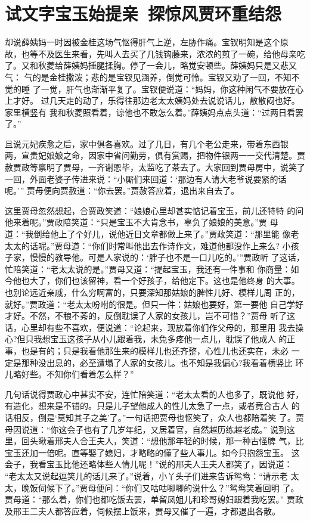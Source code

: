 \chapter{试文字宝玉始提亲~探惊风贾环重结怨}

却说薛姨妈一时因被金桂这场气怄得肝气上逆，左胁作痛。宝钗明知是这个原
故，也等不及医生来看，先叫人去买了几钱钩藤来，浓浓的煎了一碗，给他母亲吃
了。又和秋菱给薛姨妈捶腿揉胸。停了一会儿，略觉安顿些。薛姨妈只是又悲又气：
气的是金桂撒泼；悲的是宝钗见涵养，倒觉可怜。宝钗又劝了一回，不知不觉的睡
了一觉，肝气也渐渐平复了。宝钗便说道：“妈妈，你这种闲气不要放在心上才好。
过几天走的动了，乐得往那边老太太姨妈处去说说话儿，散散闷也好。家里横竖有
我和秋菱照看着，谅他也不敢怎么着。”薛姨妈点点头道：“过两日看罢了。”

且说元妃疾愈之后，家中俱各喜欢。过了几日，有几个老公走来，带着东西银
两，宣贵妃娘娘之命，因家中省问勤劳，俱有赏赐，把物件银两一一交代清楚。贾
赦贾政等禀明了贾母，一齐谢恩毕，太监吃了茶去了。大家回到贾母房中，说笑了
一回，外面老婆子传进来说：“小厮们来回道：‘那边有人请大老爷说要紧的话呢。’”
贾母便向贾赦道：“你去罢。”贾赦答应着，退出来自去了。

这里贾母忽然想起，合贾政笑道：“娘娘心里却甚实惦记着宝玉，前儿还特特
的问他来着呢。”贾政陪笑道：“只是宝玉不大肯念书，辜负了娘娘的美意。”贾
母道：“我倒给他上了个好儿，说他近日文章都做上来了。”贾政笑道：“那里能
像老太太的话呢。”贾母道：“你们时常叫他出去作诗作文，难道他都没作上来么?
小孩子家，慢慢的教导他。可是人家说的：‘胖子也不是一口儿吃的。’”贾政听
了这话，忙陪笑道：“老太太说的是。”贾母又道：“提起宝玉，我还有一件事和
你商量：如今他也大了，你们也该留神，看一个好孩子，给他定下。这也是他终身
的大事。也别论远近亲戚，什么穷啊富的，只要深知那姑娘的脾性儿好、模样儿周
正的，就好。”贾政道：“老太太吩咐的很是。但只一件：姑娘也要好，第一要他
自己学好才好。不然，不稂不莠的，反倒耽误了人家的女孩儿，岂不可惜？”贾母
听了这话，心里却有些不喜欢，便说道：“论起来，现放着你们作父母的，那里用
我去操心?但只我想宝玉这孩子从小儿跟着我，未免多疼他一点儿，耽误了他成人
的正事，也是有的；只是我看他那生来的模样儿也还齐整，心性儿也还实在，未必
一定是那种没出息的，必至遭塌了人家的女孩儿。也不知是我偏心?我看着横竖比
环儿略好些。不知你们看着怎么样？”

几句话说得贾政心中甚实不安，连忙陪笑道：“老太太看的人也多了，既说他
好，有造化，想来是不错的。只是儿子望他成人的性儿太急了一点，或者竟合古人
的话相反，倒是‘莫知其子之美’了。”一句话把贾母也怄笑了，众人也都陪着笑
了。贾母因说道：“你这会子也有了几岁年纪，又居着官，自然越历练越老成。”
说到这里，回头瞅着邢夫人合王夫人，笑道：“想他那年轻的时候，那一种古怪脾
气，比宝玉还加一倍呢。直等娶了媳妇，才略略的懂了些人事儿。如今只抱怨宝玉。
这会子，我看宝玉比他还略体些人情儿呢！”说的邢夫人王夫人都笑了，因说道：
“老太太又说起逗笑儿的话儿来了。”说着，小丫头子们进来告诉鸳鸯：“请示老
太太，晚饭伺候下了。”贾母便问：“你们又咕咕唧唧的说什么？”鸳鸯笑着回明
了。贾母道：“那么着，你们也都吃饭去罢，单留凤姐儿和珍哥媳妇跟着我吃罢。”
贾政及邢王二夫人都答应着，伺候摆上饭来，贾母又催了一遍，才都退出各散。


